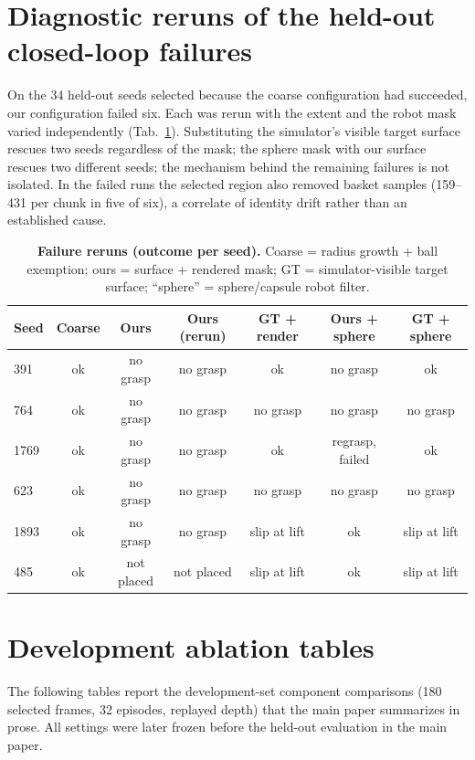 \documentclass[10pt,twocolumn,letterpaper]{article}
\begin{document}
\section{Diagnostic reruns of the held-out closed-loop failures}
On the 34 held-out seeds selected because the coarse configuration had succeeded, our configuration failed six. Each was rerun with the extent and the robot mask varied independently (Tab.~\ref{tab:supp-diag}). Substituting the simulator's visible target surface rescues two seeds regardless of the mask; the sphere mask with our surface rescues two different seeds; the mechanism behind the remaining failures is not isolated. In the failed runs the selected region also removed basket samples (159--431 per chunk in five of six), a correlate of identity drift rather than an established cause.
\begin{table}[h]
\centering
\caption{\textbf{Failure reruns (outcome per seed).} Coarse = radius growth + ball exemption; ours = surface + rendered mask; GT = simulator-visible target surface; ``sphere'' = sphere/capsule robot filter.}
\label{tab:supp-diag}
\footnotesize
\setlength{\tabcolsep}{3.5pt}
\begin{tabular}{lcccccc}
\toprule
Seed & Coarse & Ours & Ours (rerun) & GT + render & Ours + sphere & GT + sphere\\
\midrule
391 & ok & no grasp & no grasp & ok & no grasp & ok\\
764 & ok & no grasp & no grasp & no grasp & no grasp & no grasp\\
1769 & ok & no grasp & no grasp & ok & regrasp, failed & ok\\
623 & ok & no grasp & no grasp & no grasp & no grasp & no grasp\\
1893 & ok & no grasp & no grasp & slip at lift & ok & slip at lift\\
485 & ok & not placed & not placed & slip at lift & ok & slip at lift\\
\bottomrule
\end{tabular}
\end{table}

\section{Development ablation tables}
The following tables report the development-set component comparisons (180 selected frames, 32 episodes, replayed depth) that the main paper summarizes in prose. All settings were later frozen before the held-out evaluation in the main paper.
\end{document}
